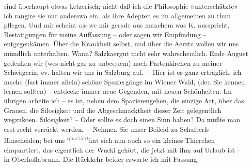                   {\pb}sind überhaupt etwas ketzerisch; nicht daß ich die
               Philosophie »unterschätzte« – ich rangire sie nur anderswo ein, als ihre Adepten es
               im allgemeinen zu thun pflegen. Und mir scheint als we{\geminationn}
               mir gerade aus manchem was K. ausspricht,
               Bestätigungen für meine Auffassung – oder sagen wir Empfindung – entgegenkämen. Über
               die Krankheit selbst, und über die Aerzte wollen wir uns mündlich unterhalten. Wann?
                  Salzka{\geminationm}ergut
               nicht sehr wahrscheinlich. Ende August gedenken wir (we{\geminationn}s nicht gar zu unbequem) nach Partenkirchen zu meiner Schwägerin, ev. halten wir uns in Salzburg auf. – Hier ist es ganz erträglich, ich mache (fast
               immer allein) schöne Spaziergänge im Wiener Wald,
               (den Sie kennen lernen sollten) – entdecke immer neue Gegenden, mit neuen
               Schönheiten. Im übrigen arbeite ich – es ist, neben dem Spazierengehen, die einzige
               Art, über das Grauen, die Si{\geminationn}losigkeit und die
               Abgeschmacktheit dieser Zeit gelegentlich wegzuko{\geminationm}en.
                  Si{\geminationn}losigkeit? – Oder sollte es doch einen Sinn haben?
                  Da{\geminationn} müßte man erst recht verrückt werden. – Nehmen
               Sie unser Beileid zu Schufterls Hinscheiden; bei uns \substVorne{}\textsuperscript{\textcolor{gray}{quartiert}}\substDazwischen{}hat\substHinten{} sich \introOben{}nun\introOben{} auch so ein kleines Thierchen
               einquartiert, das eigentlich der Wucki gehört,
               die jetzt mit ihm auf Urlaub ist – in Oberhollabrunn. Die Rückkehr beider erwarte ich mit Fassung.\pend
           
